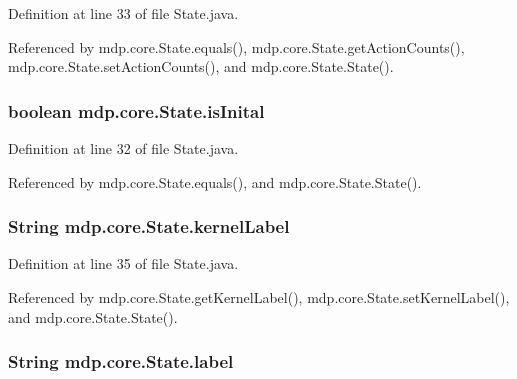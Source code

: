 Definition at line 33 of file State.\+java.



Referenced by mdp.\+core.\+State.\+equals(), mdp.\+core.\+State.\+get\+Action\+Counts(), mdp.\+core.\+State.\+set\+Action\+Counts(), and mdp.\+core.\+State.\+State().

\hypertarget{classmdp_1_1core_1_1_state_a06eb4d38e11e4be71c5e072fe9f9bee3}{}
\subsubsection[{is\+Inital}]{\setlength{\rightskip}{0pt plus 5cm}boolean mdp.\+core.\+State.\+is\+Inital\hspace{0.3cm}{\ttfamily [private]}}\label{classmdp_1_1core_1_1_state_a06eb4d38e11e4be71c5e072fe9f9bee3}


Definition at line 32 of file State.\+java.



Referenced by mdp.\+core.\+State.\+equals(), and mdp.\+core.\+State.\+State().

\hypertarget{classmdp_1_1core_1_1_state_ac7ca184df7a0ec4141766692290c18ab}{}
\subsubsection[{kernel\+Label}]{\setlength{\rightskip}{0pt plus 5cm}String mdp.\+core.\+State.\+kernel\+Label\hspace{0.3cm}{\ttfamily [private]}}\label{classmdp_1_1core_1_1_state_ac7ca184df7a0ec4141766692290c18ab}


Definition at line 35 of file State.\+java.



Referenced by mdp.\+core.\+State.\+get\+Kernel\+Label(), mdp.\+core.\+State.\+set\+Kernel\+Label(), and mdp.\+core.\+State.\+State().

\hypertarget{classmdp_1_1core_1_1_state_a40b54cc46e175c748d5ce129aba70633}{}
\subsubsection[{label}]{\setlength{\rightskip}{0pt plus 5cm}String mdp.\+core.\+State.\+label\hspace{0.3cm}{\ttfamily [private]}}\label{classmdp_1_1core_1_1_state_a40b54cc46e175c748d5ce129aba70633}


